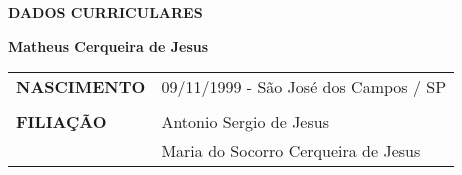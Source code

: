 \documentclass[
  12pt,		%
  a4paper,	%
  openright,%
  oneside,	%
  chapter=TITLE,		%
  section=TITLE,		%
  english,	%
  french,	%
  spanish,	%
  brazil	%
]{abntex2}
\newcommand{\nomeDoAutor}{
    Matheus Cerqueira de Jesus
    }
\begin{document}
    
    \imprimircapa
    \imprimirfolhaderosto

    
    
    
    \begin{center}
        \normalsize{\textbf{\MakeUppercase{Dados Curriculares}}} \par
        \vspace*{1cm}
        \normalsize{\textbf{\MakeUppercase\nomeDoAutor}} \par
        \vspace*{1cm}
        
        \begin{tabular}{ l p{7cm} }
            \textbf{\MakeUppercase{Nascimento}} & 09/11/1999 - São José dos Campos / SP \\
            \\
            \textbf{\MakeUppercase{Filiação}} & Antonio Sergio de Jesus \\
            & Maria do Socorro Cerqueira de Jesus \\
        \end{tabular}
    \end{center}
    \newpage
    
    
\end{document}
